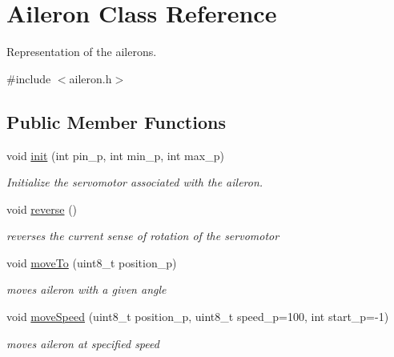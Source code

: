 \hypertarget{class_aileron}{}\section{Aileron Class Reference}
\label{class_aileron}


Representation of the ailerons.  




{\ttfamily \#include $<$aileron.\+h$>$}

\subsection*{Public Member Functions}
\begin{DoxyCompactItemize}
\item 
void \hyperlink{class_aileron_ad28b0e5e53705b1f43a3fa73c0765a96}{init} (int pin\+\_\+p, int min\+\_\+p, int max\+\_\+p)
\begin{DoxyCompactList}\small\item\em Initialize the servomotor associated with the aileron. \end{DoxyCompactList}\item 
\mbox{\label{class_aileron_a5d5579971f2679d708d01657d63da414}} 
void \hyperlink{class_aileron_a5d5579971f2679d708d01657d63da414}{reverse} ()
\begin{DoxyCompactList}\small\item\em reverses the current sense of rotation of the servomotor \end{DoxyCompactList}\item 
void \hyperlink{class_aileron_af05ea195df6881618c7835153537cba1}{move\+To} (uint8\+\_\+t position\+\_\+p)
\begin{DoxyCompactList}\small\item\em moves aileron with a given angle \end{DoxyCompactList}\item 
void \hyperlink{class_aileron_a02d1842c6782dbb43fd70d1e3669c960}{move\+Speed} (uint8\+\_\+t position\+\_\+p, uint8\+\_\+t speed\+\_\+p=100, int start\+\_\+p=-\/1)
\begin{DoxyCompactList}\small\item\em moves aileron at specified speed \end{DoxyCompactList}\item 
\mbox{\label{class_aileron_abeee29a990a1a9b3d8bc884991b7221f}} 

\end{DoxyCompactItemize}
